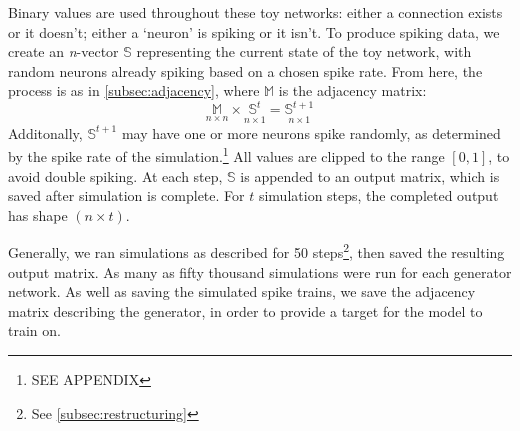 \begin{table}[h]
	\centering
	
	\hspace{2em}
	\label{fig:toyex}
\end{table}\noindent
Binary values are used throughout these toy networks: either a connection exists 
or it doesn't; either a `neuron' is spiking or it isn't. To produce spiking 
data, we create an \textit{n}-vector $\mathbb{S}$ representing the current state 
of the toy network, with random neurons already spiking based on a chosen spike 
rate. From here, the process is as in \ref{subsec:adjacency}, where $\mathbb{M}$ 
is the adjacency matrix:
\[
	\underset{n \times n}{\mathbb{M}} \times \underset{n \times 1}{\mathbb{S}^t} 
	= \underset{n \times 1}{\mathbb{S}^{t+1}}
\]
Additonally, $\mathbb{S}^{t+1}$ may have one or more neurons spike randomly, as 
determined by the spike rate of the simulation.\footnote{SEE APPENDIX} All 
values are clipped to the range $[0,1]$, to avoid double spiking. At each step, 
$\mathbb{S}$ is appended to an output matrix, which is saved after simulation is 
complete. For $t$ simulation steps, the completed output has shape $(n \times 
t)$.

Generally, we ran simulations as described for 50 steps\footnote{See 
\ref{subsec:restructuring}}, then saved the resulting output matrix. As many as 
fifty thousand simulations were run for each generator network.
As well as saving the simulated spike trains, we save the adjacency matrix 
describing the generator, in order to provide a target for the model to train 
on.

